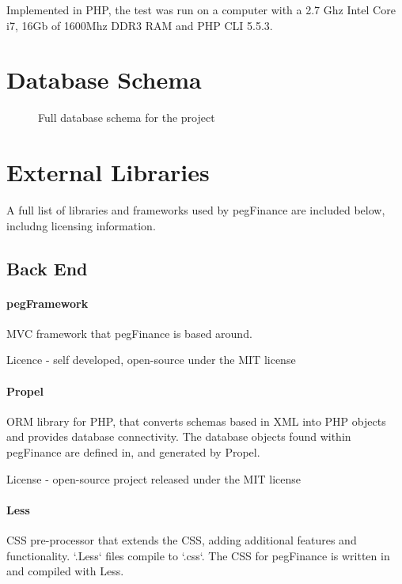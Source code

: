 \begin{appendices}
Implemented in PHP, the test was run on a computer with a 2.7 Ghz Intel Core i7, 16Gb of 1600Mhz DDR3 RAM and PHP CLI 5.5.3.



\chapter{Database Schema} \label{cha:databaseschema}

\begin{figure}[p]
    \vspace*{-2cm}
    \caption{Full database schema for the project}
\end{figure}

\chapter{External Libraries} \label{app:externallibraries}

A full list of libraries and frameworks used by pegFinance are included below, includng licensing information.

\section{Back End}
\subsubsection{pegFramework}
MVC framework that pegFinance is based around. 

Licence - self developed, open-source under the MIT license

\subsubsection{Propel}
ORM library for PHP, that converts schemas based in XML into PHP objects and provides database connectivity.
%
The database objects found within pegFinance are defined in, and generated by Propel. 

License - open-source project released under the MIT license

\subsubsection{Less}
CSS pre-processor that extends the CSS, adding additional features and functionality. `.Less` files compile to `.css`.
%
The CSS for pegFinance is written in and compiled with Less.


\end{appendices}
